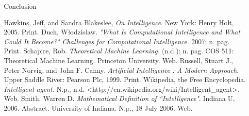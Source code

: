 \documentclass[11pt, oneside]{article}
\begin{document}
\par Conclusion

\begin{thebibliography}{9}
	Hawkins, Jeff, and Sandra Blakeslee,
	\emph{On Intelligence}.
	New York: Henry Holt, 2005.
	Print.
	Duch, W\l{}odzis\l{}aw.
	\emph{"What Is Computational Intelligence and What Could It Become?" Challenges for Computational Intelligence.}
	2007: n. pag. Print.
	Schapire, Rob. 
	\emph{Theoretical Machine Learning.} 
	(n.d.): n. pag. COS 511: Theoretical Machine Learning. Princeton University. 
	Web.
	Russell, Stuart J., Peter Norvig, and John F. Canny. 
	\emph{Artificial Intelligence : A Modern Approach.}
	Upper Saddle River: Pearson Plc, 1999. Print.
	Wikipedia, the Free Encyclopedia. 
	\emph{Intelligent agent}.
	N.p., n.d. <http://en.wikipedia.org/wiki/Intelligent\_agent>.
	Web.
	Smith, Warren D. 
	\emph{Mathematical Definition of ``Intelligence"}.
	Indiana U, 2006. Abstract. University of Indiana. N.p., 18 July 2006. 
	Web.
\end{thebibliography}
\end{document}
